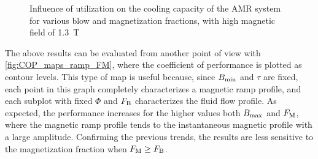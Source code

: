 \documentclass[referee]{svjour3}
\newcommand{\bmax}{\ensuremath{{B}\ped{max}}}
\newcommand{\bmin}{\ensuremath{{B}\ped{min}}}
\begin{document}
\begin{figure}[!ht]
  \centering
\quad
  \caption{Influence of utilization on the cooling capacity of the AMR system for  various blow and magnetization fractions, with high magnetic field of \SI{1.3}{\tesla}}
  \label{fig:Qc_curves_ramp_phi}
\end{figure}

The above results can be evaluated from another point of view with \autoref{fig:COP_maps_ramp_FM}, where the coefficient of performance is plotted as contour levels. This type of map is useful because, since $\bmin$ and $\tau$ are fixed, each point in this graph completely characterizes a magnetic ramp profile, and each subplot with fixed $\Phi$ and $F_{\mathrm{B}}$ characterizes the fluid flow profile. As expected, the performance increases for the higher values both $\bmax$ and $F_{\mathrm{M}}$, where the  magnetic ramp profile tends to the instantaneous magnetic profile with a large amplitude. Confirming the previous trends, the results are less sensitive to the magnetization fraction when $F_{\mathrm{M}} \ge F_{\mathrm{B}}$. 
\end{document}
